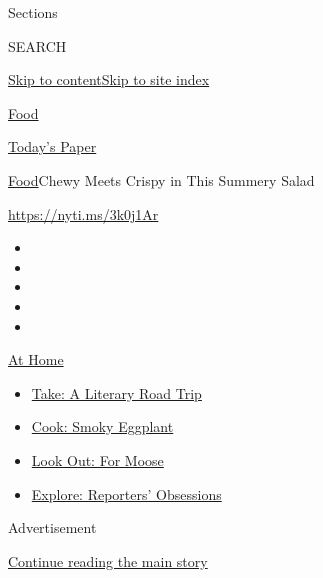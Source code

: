 Sections

SEARCH

\protect\hyperlink{site-content}{Skip to
content}\protect\hyperlink{site-index}{Skip to site index}

\href{https://www.nytimes.com/section/food}{Food}

\href{https://myaccount.nytimes.com/auth/login?response_type=cookie\&client_id=vi}{}

\href{https://www.nytimes.com/section/todayspaper}{Today's Paper}

\href{/section/food}{Food}\textbar{}Chewy Meets Crispy in This Summery
Salad

\url{https://nyti.ms/3k0j1Ar}

\begin{itemize}
\item
\item
\item
\item
\item
\end{itemize}

\href{https://www.nytimes.com/spotlight/at-home?action=click\&pgtype=Article\&state=default\&region=TOP_BANNER\&context=at_home_menu}{At
Home}

\begin{itemize}
\tightlist
\item
  \href{https://www.nytimes.com/2020/07/28/books/time-for-a-literary-road-trip.html?action=click\&pgtype=Article\&state=default\&region=TOP_BANNER\&context=at_home_menu}{Take:
  A Literary Road Trip}
\item
  \href{https://www.nytimes.com/2020/07/29/magazine/bored-with-your-home-cooking-some-smoky-eggplant-will-fix-that.html?action=click\&pgtype=Article\&state=default\&region=TOP_BANNER\&context=at_home_menu}{Cook:
  Smoky Eggplant}
\item
  \href{https://www.nytimes.com/2020/07/27/travel/moose-michigan-isle-royale.html?action=click\&pgtype=Article\&state=default\&region=TOP_BANNER\&context=at_home_menu}{Look
  Out: For Moose}
\item
  \href{https://www.nytimes.com/interactive/2020/at-home/even-more-reporters-editors-diaries-lists-recommendations.html?action=click\&pgtype=Article\&state=default\&region=TOP_BANNER\&context=at_home_menu}{Explore:
  Reporters' Obsessions}
\end{itemize}

Advertisement

\protect\hyperlink{after-top}{Continue reading the main story}

